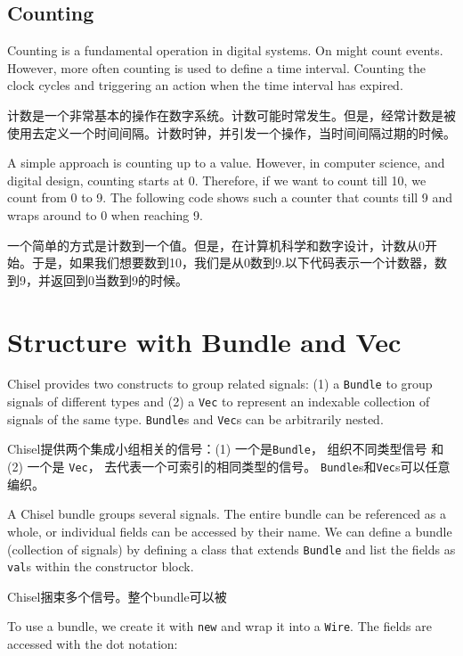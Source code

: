 \documentclass[%
    10pt,
    headinclude, footexclude,
    openright, %
    notitlepage,
    cleardoubleempty,
    headsepline,
    pointlessnumbers,
    bibtotoc, idxtotoc,
    ]{scrbook}
\newcommand{\code}[1]{{\small{\texttt{#1}}}}
\begin{document}
\subsection{Counting}

Counting is a fundamental operation in digital systems. On might count events.
However, more often counting is used to define a time interval. Counting the
clock cycles and triggering an action when the time interval has expired.

计数是一个非常基本的操作在数字系统。计数可能时常发生。但是，经常计数是被使用去定义一个时间间隔。计数时钟，并引发一个操作，当时间间隔过期的时候。


A simple approach is counting up to a value. However, in computer science,
and digital design, counting starts at 0. Therefore, if we want to count till
10, we count from 0 to 9. The following code shows such a counter that counts
till 9 and wraps around to 0 when reaching 9.

一个简单的方式是计数到一个值。但是，在计算机科学和数字设计，计数从0开始。于是，如果我们想要数到10，我们是从0数到9.以下代码表示一个计数器，数到9，并返回到0当数到9的时候。



\section{Structure with Bundle and Vec}

Chisel provides two constructs to group related signals: (1) a \code{Bundle} to group
signals of different types and (2) a \code{Vec} to represent an indexable collection of signals
of the same type.
\code{Bundle}s and \code{Vec}s can be arbitrarily nested.

Chisel提供两个集成小组相关的信号：(1) 一个是\code{Bundle}， 组织不同类型信号 和 
(2) 一个是 \code{Vec}， 去代表一个可索引的相同类型的信号。
\code{Bundle}s和\code{Vec}s可以任意编织。


A Chisel bundle groups several signals. The entire bundle can be referenced
as a whole, or individual fields can be accessed by their name.
We can define a bundle (collection of signals) by defining a class that
extends \code{Bundle} and list the fields as \code{val}s within the constructor block.

Chisel捆束多个信号。整个bundle可以被



\noindent To use a bundle, we create it with \code{new} and wrap it into a \code{Wire}.
The fields are accessed with the dot notation:
\end{document}
